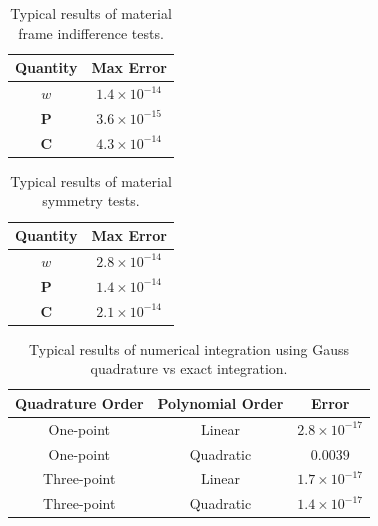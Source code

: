 \documentclass[]{spie}  %
\newcommand\Tstrut{\rule{0pt}{2.6ex}}         %
\begin{document}


\begin{table}[h]
	\centering
	\caption{Typical results of material frame indifference tests.}
	\begin{tabular}{ | c | c | }
		\hline
		Quantity & Max Error \Tstrut \\ \hline
		$w$ 		& $1.4 \times 10^{-14}$ \Tstrut \\
		$\bm{P}$ 	& $3.6 \times 10^{-15}$ \\
		$\bm{C}$ 	& $4.3 \times 10^{-14}$ \\
		\hline
	\end{tabular}
	\label{table: material frame indifference}
\end{table}

\begin{table}[h]
	\centering
	\caption{Typical results of material symmetry tests.}
	\begin{tabular}{ | c | c | }
		\hline
		Quantity & Max Error \Tstrut \\ \hline
		$w$ 		& $2.8 \times 10^{-14}$ \Tstrut \\
		$\bm{P}$ 	& $1.4 \times 10^{-14}$ \\
		$\bm{C}$ 	& $2.1 \times 10^{-14}$ \\
		\hline
	\end{tabular}
	\label{table: material symmetry}
\end{table}

\begin{table}[h]
	\centering
	\caption{Typical results of numerical integration using Gauss quadrature vs exact integration.}
	\begin{tabular}{ | c | c | c | }
		\hline
		Quadrature Order & Polynomial Order & Error \Tstrut \\ \hline
		One-point 	& Linear    &  $2.8 \times 10^{-17}$ \Tstrut \\
		One-point 	& Quadratic &  $0.0039$ \\
		Three-point & Linear 	&  $1.7 \times 10^{-17}$ \\
		Three-point & Quadratic &  $1.4 \times 10^{-17}$ \\
		\hline
	\end{tabular}
	\label{table: gauss quadrature integration}
\end{table}
\end{document}

